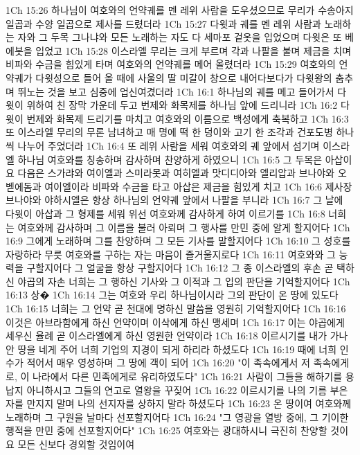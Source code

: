 1Ch 15:26  하나님이 여호와의 언약궤를 멘 레위 사람을 도우셨으므로 무리가 수송아지 일곱과 수양 일곱으로 제사를 드렸더라
1Ch 15:27  다윗과 궤를 멘 레위 사람과 노래하는 자와 그 두목 그나냐와 모든 노래하는 자도 다 세마포 겉옷을 입었으며 다윗은 또 베 에봇을 입었고
1Ch 15:28  이스라엘 무리는 크게 부르며 각과 나팔을 불며 제금을 치며 비파와 수금을 힘있게 타며 여호와의 언약궤를 메어 올렸더라
1Ch 15:29  여호와의 언약궤가 다윗성으로 들어 올 때에 사울의 딸 미갈이 창으로 내어다보다가 다윗왕의 춤추며 뛰노는 것을 보고 심중에 업신여겼더라
1Ch 16:1  하나님의 궤를 메고 들어가서 다윗이 위하여 친 장막 가운데 두고 번제와 화목제를 하나님 앞에 드리니라
1Ch 16:2  다윗이 번제와 화목제 드리기를 마치고 여호와의 이름으로 백성에게 축복하고
1Ch 16:3  또 이스라엘 무리의 무론 남녀하고 매 명에 떡 한 덩이와 고기 한 조각과 건포도병 하나씩 나누어 주었더라
1Ch 16:4  또 레위 사람을 세워 여호와의 궤 앞에서 섬기며 이스라엘 하나님 여호와를 칭송하며 감사하며 찬양하게 하였으니
1Ch 16:5  그 두목은 아삽이요 다음은 스가랴와 여이엘과 스미라못과 여히엘과 맛디디아와 엘리압과 브나야와 오벧에돔과 여이엘이라 비파와 수금을 타고 아삽은 제금을 힘있게 치고
1Ch 16:6  제사장 브나야와 야하시엘은 항상 하나님의 언약궤 앞에서 나팔을 부니라
1Ch 16:7  그 날에 다윗이 아삽과 그 형제를 세워 위선 여호와께 감사하게 하여 이르기를
1Ch 16:8  너희는 여호와께 감사하며 그 이름을 불러 아뢰며 그 행사를 만민 중에 알게 할지어다
1Ch 16:9  그에게 노래하며 그를 찬양하며 그 모든 기사를 말할지어다
1Ch 16:10  그 성호를 자랑하라 무릇 여호와를 구하는 자는 마음이 즐거울지로다
1Ch 16:11  여호와와 그 능력을 구할지어다 그 얼굴을 항상 구할지어다
1Ch 16:12  그 종 이스라엘의 후손 곧 택하신 야곱의 자손 너희는 그 행하신 기사와 그 이적과 그 입의 판단을 기억할지어다
1Ch 16:13  상�
1Ch 16:14  그는 여호와 우리 하나님이시라 그의 판단이 온 땅에 있도다
1Ch 16:15  너희는 그 언약 곧 천대에 명하신 말씀을 영원히 기억할지어다
1Ch 16:16  이것은 아브라함에게 하신 언약이며 이삭에게 하신 맹세며
1Ch 16:17  이는 야곱에게 세우신 율례 곧 이스라엘에게 하신 영원한 언약이라
1Ch 16:18  이르시기를 내가 가나안 땅을 네게 주어 너희 기업의 지경이 되게 하리라 하셨도다
1Ch 16:19  때에 너희 인수가 적어서 매우 영성하며 그 땅에 객이 되어
1Ch 16:20  "이 족속에게서 저 족속에게로, 이 나라에서 다른 민족에게로 유리하였도다"
1Ch 16:21  사람이 그들을 해하기를 용납지 아니하시고 그들의 연고로 열왕을 꾸짖어
1Ch 16:22  이르시기를 나의 기름 부은 자를 만지지 말며 나의 선지자를 상하지 말라 하셨도다
1Ch 16:23  온 땅이여 여호와께 노래하며 그 구원을 날마다 선포할지어다
1Ch 16:24  "그 영광을 열방 중에, 그 기이한 행적을 만민 중에 선포할지어다"
1Ch 16:25  여호와는 광대하시니 극진히 찬양할 것이요 모든 신보다 경외할 것임이여
